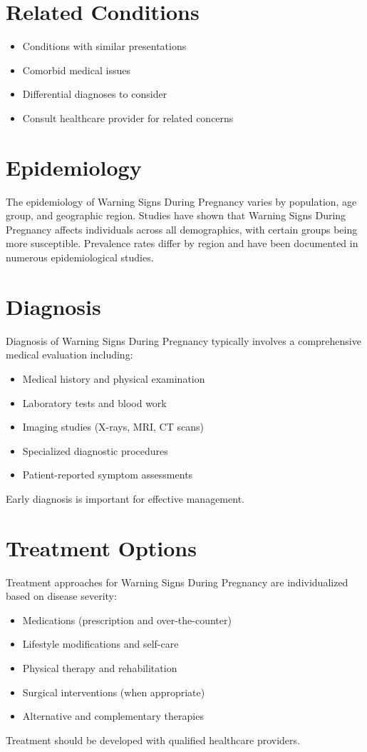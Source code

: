 \section*{Related Conditions}
\begin{itemize}
  \item Conditions with similar presentations
  \item Comorbid medical issues
  \item Differential diagnoses to consider
  \item Consult healthcare provider for related concerns
\end{itemize}

\section*{Epidemiology}
The epidemiology of Warning Signs During Pregnancy varies by population, age group, and geographic region. Studies have shown that Warning Signs During Pregnancy affects individuals across all demographics, with certain groups being more susceptible. Prevalence rates differ by region and have been documented in numerous epidemiological studies.

\section*{Diagnosis}
Diagnosis of Warning Signs During Pregnancy typically involves a comprehensive medical evaluation including:
\begin{itemize}
  \item Medical history and physical examination
  \item Laboratory tests and blood work
  \item Imaging studies (X-rays, MRI, CT scans)
  \item Specialized diagnostic procedures
  \item Patient-reported symptom assessments
\end{itemize}
Early diagnosis is important for effective management.

\section*{Treatment Options}
Treatment approaches for Warning Signs During Pregnancy are individualized based on disease severity:
\begin{itemize}
  \item Medications (prescription and over-the-counter)
  \item Lifestyle modifications and self-care
  \item Physical therapy and rehabilitation
  \item Surgical interventions (when appropriate)
  \item Alternative and complementary therapies
\end{itemize}
Treatment should be developed with qualified healthcare providers.

